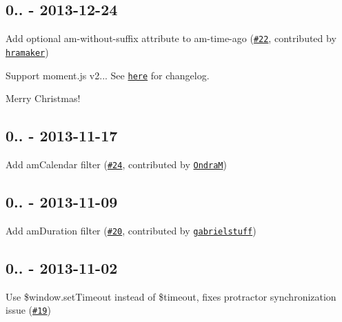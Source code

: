\subsection*{0.. -\/ 2013-\/12-\/24}


\begin{DoxyItemize}
\item Add optional {\ttfamily am-\/without-\/suffix} attribute to {\ttfamily am-\/time-\/ago} (\href{https://github.com/urish/angular-moment/issues/22}{\tt \#22}, contributed by \href{https://github.com/hramaker}{\tt hramaker})
\item Support moment.\+js v2... See \href{https://gist.github.com/ichernev/8104451}{\tt here} for changelog.
\item Merry Christmas!
\end{DoxyItemize}

\subsection*{0.. -\/ 2013-\/11-\/17}


\begin{DoxyItemize}
\item Add {\ttfamily am\+Calendar} filter (\href{https://github.com/urish/angular-moment/issues/24}{\tt \#24}, contributed by \href{https://github.com/OndraM}{\tt OndraM})
\end{DoxyItemize}

\subsection*{0.. -\/ 2013-\/11-\/09}


\begin{DoxyItemize}
\item Add {\ttfamily am\+Duration} filter (\href{https://github.com/urish/angular-moment/issues/20}{\tt \#20}, contributed by \href{https://github.com/gabrielstuff}{\tt gabrielstuff})
\end{DoxyItemize}

\subsection*{0.. -\/ 2013-\/11-\/02}


\begin{DoxyItemize}
\item Use \$window.\+set\+Timeout instead of \$timeout, fixes protractor synchronization issue (\href{https://github.com/urish/angular-moment/issues/19}{\tt \#19})
\end{DoxyItemize}

